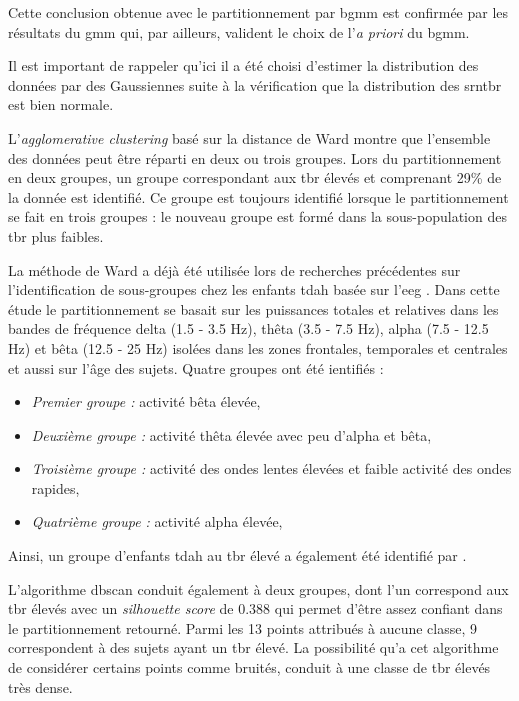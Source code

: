 Cette conclusion obtenue avec le partitionnement par \gls{bgmm} est confirmée par les résultats du \gls{gmm} qui, par ailleurs, valident le choix de 
l'\textit{a priori} du \gls{bgmm}. 

Il est important de rappeler qu'ici il a été choisi d'estimer la distribution des données par des Gaussiennes suite à la vérification que la distribution des 
\gls{srntbr} est bien normale.

L'\textit{agglomerative clustering} basé sur la distance de Ward montre que l'ensemble des données peut être réparti 
en deux ou trois groupes. Lors du partitionnement en deux groupes, un groupe correspondant aux \gls{tbr} élevés et comprenant 29\% de la donnée
est identifié. Ce groupe est toujours identifié lorsque le partitionnement se fait en trois groupes : le nouveau groupe est formé dans la sous-population
des \gls{tbr} plus faibles. 

La méthode de Ward a déjà été utilisée lors de recherches 
précédentes sur l'identification de sous-groupes chez les enfants \gls{tdah} basée sur l'\gls{eeg} \citep{Clarke2011}. Dans cette étude le partitionnement
se basait sur les puissances totales et relatives dans les bandes de fréquence delta (1.5 - 3.5 Hz), thêta (3.5 - 7.5 Hz), alpha (7.5 - 12.5 Hz) et bêta 
(12.5 - 25 Hz) isolées dans les zones frontales, temporales et centrales et aussi sur l'âge des sujets. Quatre groupes ont été ientifiés : 
\begin{itemize}
\item \emph{Premier groupe :} activité bêta élevée,
\item \emph{Deuxième groupe :} activité thêta élevée avec peu d'alpha et bêta,
\item \emph{Troisième groupe :} activité des ondes lentes élevées et faible activité des ondes rapides,
\item \emph{Quatrième groupe :} activité alpha élevée,
\end{itemize}

Ainsi, un groupe d'enfants \gls{tdah} au \gls{tbr} élevé a également été identifié par \citet{Clarke2011}.

L'algorithme \gls{dbscan} conduit également à deux groupes, dont l'un correspond aux \gls{tbr} élevés avec un \textit{silhouette score} de 0.388 
qui permet d'être assez confiant dans le partitionnement retourné. Parmi les 13 points attribués à 
aucune classe, 9 correspondent à des sujets ayant un \gls{tbr} élevé. La possibilité qu'a cet algorithme de considérer certains points comme bruités, conduit à
une classe de \gls{tbr} élevés très dense. 

